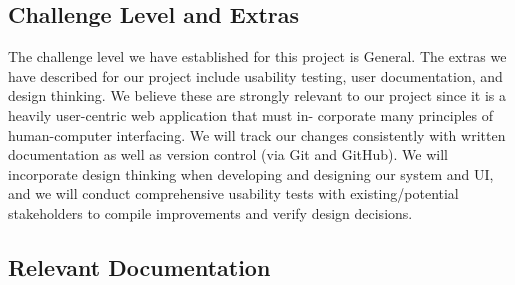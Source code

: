 \documentclass[12pt, titlepage]{article}
\begin{document}

\subsection{Challenge Level and Extras}

The challenge level we have established for this project is General.
The extras we have described for our project include usability testing, user
documentation, and design thinking. We believe these are strongly relevant
to our project since it is a heavily user-centric web application that must in-
corporate many principles of human-computer interfacing. We will track our
changes consistently with written documentation as well as version control (via
Git and GitHub). We will incorporate design thinking when developing and
designing our system and UI, and we will conduct comprehensive usability tests
with existing/potential stakeholders to compile improvements and verify design
decisions.



\subsection{Relevant Documentation}
\end{document}

